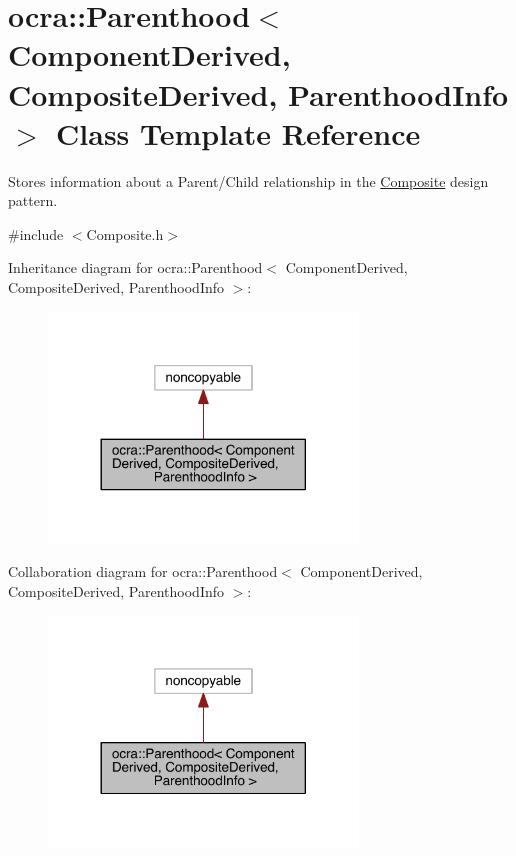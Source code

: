\hypertarget{classocra_1_1Parenthood}{}\section{ocra\+:\+:Parenthood$<$ Component\+Derived, Composite\+Derived, Parenthood\+Info $>$ Class Template Reference}
\label{classocra_1_1Parenthood}


Stores information about a Parent/\+Child relationship in the \hyperlink{classocra_1_1Composite}{Composite} design pattern.  




{\ttfamily \#include $<$Composite.\+h$>$}



Inheritance diagram for ocra\+:\+:Parenthood$<$ Component\+Derived, Composite\+Derived, Parenthood\+Info $>$\+:\nopagebreak
\begin{figure}[H]
\begin{center}
\leavevmode
\includegraphics[width=233pt]{d3/d99/classocra_1_1Parenthood__inherit__graph}
\end{center}
\end{figure}


Collaboration diagram for ocra\+:\+:Parenthood$<$ Component\+Derived, Composite\+Derived, Parenthood\+Info $>$\+:\nopagebreak
\begin{figure}[H]
\begin{center}
\leavevmode
\includegraphics[width=233pt]{d2/dba/classocra_1_1Parenthood__coll__graph}
\end{center}
\end{figure}
